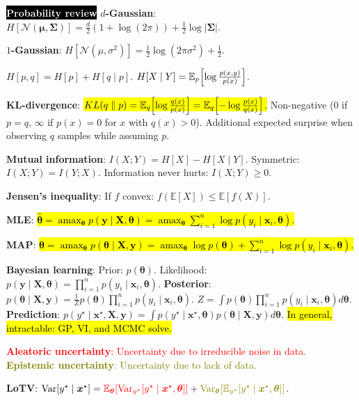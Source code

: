 \documentclass{article}
\DeclareRobustCommand{\hlal}[1]{{\textcolor{red}{#1}}}
\DeclareRobustCommand{\hlep}[1]{{\textcolor{olive}{#1}}}
\DeclareRobustCommand{\hleq}[1]{{\sethlcolor{pink} \hl{#1}}}
\DeclareMathOperator*{\argmax}{amax}
\newcommand{\lft}{\mathopen{}\left}
\newcommand{\rgt}{\aftergroup\mathclose\aftergroup{\aftergroup}\right}
\newcommand{\E}{\mathbb{E}}
\newenvironment{topic}[1]
{\textbf{\sffamily  \colorbox{black}{\textcolor{white}{#1}}}}
{}
\begin{document}
\begin{multicols*}{3}
\begin{topic}{Probability review}
    \textbf{$d$-Gaussian}: $H[\mathcal{N}(\bm{\mu},\bm{\Sigma})] = \frac{d}{2} (1 + \log(2\pi)) + \frac{1}{2}\log |\bm{\Sigma}|$.
    
    \textbf{$1$-Gaussian}: $H[\mathcal{N}(\mu,\sigma^2)] = \frac{1}{2}\log(2\pi\sigma^2) + \frac{1}{2}$.

    $H[p,q] = H[p] + H[q\mid p]$. $H[X\mid Y] = \E_p \lft[\log \frac{p(x,
    y)}{p(x)} \rgt]$.

    \textbf{KL-divergence}: \hleq{$KL(q \mathrel{\lVert} p) = \E_q \lft[ \log
    \frac{q(x)}{p(x)} \rgt] = \E_q \lft[ -\log \frac{p(x)}{q(x)} \rgt]$.}
    Non-negative ($0$ if $p=q$, $\infty$ if $p(x)=0$ for $x$ with $q(x)>0$).
    Additional expected surprise when observing $q$ samples while assuming $p$.

    \textbf{Mutual information}: $I(X;Y) = H[X] - H[X\mid Y]$. Symmetric:
    $I(X;Y)=I(Y;X)$. Information never hurts: $I(X;Y) \geq 0$.


    \textbf{Jensen's inequality}: If $f$ convex: $f(\E[X]) \leq \E[f(X)]$.

    \textbf{MLE}: \hleq{$\hat{\bm{\theta}} = \argmax_{\bm{\theta}} p(\bm{y}\mid\bm{X}, \bm{\theta}) = \argmax_{\bm{\theta}} \sum_{i=1}^n \log p(y_i\mid \bm{x}_i, \bm{\theta})$.}

    \textbf{MAP}: \hleq{$\hat{\bm{\theta}} = \argmax_{\bm{\theta}} p(\bm{\theta} \mid \bm{X}, \bm{y}) = \argmax_{\bm{\theta}} \log p(\bm{\theta}) + \sum_{i=1}^n \log p(y_i\mid \bm{x}_i,\bm{\theta})$.}

    \textbf{Bayesian learning}: Prior: $p(\bm{\theta})$. Likelihood:
    $p(\bm{y}\mid \bm{X},\bm{\theta}) = \prod_{i=1}^n p(y_i \mid
    \bm{x}_i,\bm{\theta})$. \textbf{Posterior}: $p(\bm{\theta} \mid
    \bm{X},\bm{y}) = \frac{1}{Z} p(\bm{\theta}) \prod_{i=1}^n p(y_i \mid
    \bm{x}_i,\bm{\theta})$. $Z = \int p(\bm{\theta}) \prod_{i=1}^n p(y_i \mid
    \bm{x}_i,\bm{\theta}) d\bm{\theta}$. \textbf{Prediction}: $p(y^\star \mid
    \bm{x}^\star,\bm{X},\bm{y}) = \int p(y^\star \mid \bm{x}^\star,\bm{\theta})
    p(\bm{\theta} \mid \bm{X},\bm{y}) d\bm{\theta}$. \hl{In general,
    intractable: GP, VI, and MCMC solve.}

    \hlal{\textbf{Aleatoric uncertainty}: Uncertainty due to irreducible noise
    in data.} \hlep{\textbf{Epistemic uncertainty}: Uncertainty due to lack of
    data.}

    \textbf{LoTV}: $\mathrm{Var}[y^\star \mid \bm{x}^\star] =
    \text{\hlal{$\E_{\bm{\theta}}[\mathrm{Var}_{y^\star}[y^\star \mid \bm{x}^\star,
    \bm{\theta}]]$}} + \text{\hlep{$\mathrm{Var}_{\bm{\theta}}[\E_{y^\star}[y^\star\mid
    \bm{x}^\star, \bm{\theta}]]$}}$.
  \end{topic}


\end{multicols*}
\end{document}
